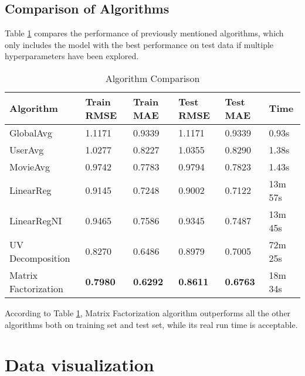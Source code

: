\documentclass[12pt]{article}
\begin{document}
\subsection{Comparison of Algorithms}
Table \ref{tab:1.4} compares the performance of previously mentioned algorithms, which only includes the model with the best performance on test data if multiple hyperparameters have been explored.
\begin{table}[ht]
    \centering
    \caption{Algorithm Comparison}
    \label{tab:1.4}
    \begin{tabular}{llllll}
        \toprule
        \textbf{Algorithm} & \textbf{Train RMSE} & \textbf{Train MAE} & \textbf{Test RMSE} & \textbf{Test MAE} & \textbf{Time}\\
        \midrule
        GlobalAvg & 1.1171 & 0.9339 & 1.1171 & 0.9339 & 0.93s\\
        UserAvg & 1.0277 & 0.8227 & 1.0355 & 0.8290 & 1.38s\\
        MovieAvg & 0.9742 & 0.7783 & 0.9794 & 0.7823 & 1.43s\\
        LinearReg & 0.9145 & 0.7248 & 0.9002 & 0.7122 & 13m 57s\\
        LinearRegNI & 0.9465 & 0.7586 & 0.9345 & 0.7487 & 13m 45s\\
        UV Decomposition & 0.8270 & 0.6486 & 0.8979 & 0.7005 & 72m 25s\\
        Matrix Factorization & \textbf{0.7980} & \textbf{0.6292} & \textbf{0.8611} & \textbf{0.6763} & 18m 34s\\
        \bottomrule
    \end{tabular}
\end{table}
\par
According to Table \ref{tab:1.4}, Matrix Factorization algorithm outperforms all the other algorithms both on training set and test set, while its real run time is acceptable.

\section{Data visualization}
\end{document}
